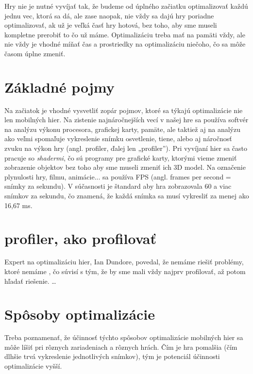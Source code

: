 \documentclass[10pt,twoside,slovak,a4paper]{article}
\begin{document}
Hry nie je nutné vyvíjať tak, že budeme od úplného začiatku optimalizovať každú jednu vec, ktorá sa dá, ale zase naopak, nie vždy sa dajú hry poriadne optimalizovať, ak už je veľká časť hry hotová, bez toho, aby sme museli kompletne prerobiť to čo už máme.
Optimalizáciu treba mať na pamäti vždy, ale nie vždy je vhodné míňať čas a prostriedky na optimalizáciu niečoho, čo sa môže časom úplne zmeniť.


\section{Základné pojmy} \label{pojmy}

Na začiatok je vhodné vysvetliť zopár pojmov, ktoré sa týkajú optimalizácie nie len mobilných hier.
Na zistenie najnáročnejších vecí v našej hre sa používa softvér na analýzu výkonu procesora, grafickej karty, pamäte,
ale taktiež aj na analýzu ako veľmi spomaľuje vykreslenie snímku osvetlenie, tiene, alebo aj náročnosť zvuku na výkon hry (angl. profiler, ďalej len „profiler”).
\label{shadre}Pri vyvíjaní hier sa často pracuje so \emph{shadermi}, čo sú programy pre grafické karty, ktorými vieme zmeniť zobrazenie objektov bez toho aby sme museli zmeniť ich 3D model.
Na označenie plynulosti hry, filmu, animácie... sa používa FPS (angl. frames per second = snímky za sekundu).
V súčasnosti je štandard aby hra zobrazovala 60 a viac snímkov za sekundu, čo znamená, že každá snímka sa musí vykresliť za menej ako 16,67 ms.

\section {profiler, ako profilovať} \label{profiler}
Expert na optimalizáciu hier, Ian Dundore, povedal, že nemáme riešiť problémy, ktoré nemáme \cite{unity-talk-optimization}, čo súvisí s tým, že by sme mali vždy najprv profilovať, až potom hľadať riešenie.
\ldots


\section{Spôsoby optimalizácie} \label{sposoby}
Treba poznamenať, že účinnosť týchto spôsobov optimalizácie mobilných hier sa môže líšiť pri rôznych zariadeniach a rôznych hrách. Čím je hra pomalšia (čím dlhšie trvá vykreslenie jednotlivých snímkov), tým je potenciál účinnosti optimalizácie vyšší.
\end{document}
